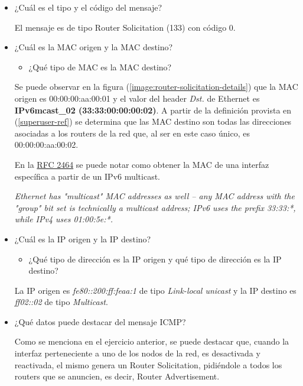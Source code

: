 \documentclass[osajnl,twocolumn,showpacs,superscriptaddress,10pt]{revtex4-1} %
\begin{document}
\begin{itemize}
    \item ¿Cuál es el tipo y el código del mensaje?
    
    El mensaje es de tipo Router Solicitation (133) con código 0.

    \item ¿Cuál es la MAC origen y la MAC destino?
    
    \begin{itemize}
        \item ¿Qué tipo de MAC es la MAC destino?
    \end{itemize}

    Se puede observar en la figura (\ref{image:router-solicitation-details}) que la MAC origen es 00:00:00:aa:00:01 y el valor del header \textit{Dst.} de Ethernet
    es \textbf{IPv6mcast\_02 (33:33:00:00:00:02)}. A partir de la definición provista en (\ref{superuser-ref}) se determina que
    las MAC destino son todas las direcciones asociadas a los routers de la red que, al ser en este caso único, es 00:00:00:aa:00:02.
    
    En la \href{https://tools.ietf.org/html/rfc2464#section-7}{RFC 2464} se puede notar como obtener la MAC de una interfaz
    específica a partir de un IPv6 multicast.
    
    \textit{Ethernet has "multicast" MAC addresses as well – any MAC address with the "group" bit set is technically a multicast address; IPv6 uses the prefix 33:33:*, while IPv4 uses 01:00:5e:*.}
    \label{superuser-ref}

    \item ¿Cuál es la IP origen y la IP destino?
    
    \begin{itemize}
        \item ¿Qué tipo de dirección es la IP origen y qué tipo de dirección es la IP destino?
    \end{itemize}

    La IP origen es \textit{fe80::200:ff:feaa:1} de tipo \textit{Link-local unicast} y la IP destino es \textit{ff02::02} de tipo \textit{Multicast}.

    \item ¿Qué datos puede destacar del mensaje ICMP?
    
    Como se menciona en el ejercicio anterior, se puede destacar que, cuando la interfaz perteneciente a uno de los nodos de la red, es desactivada y reactivada, el mismo genera un Router Solicitation, pidiéndole a todos los routers que se anuncien, es decir, Router Advertisement.
\end{itemize}
\end{document}
